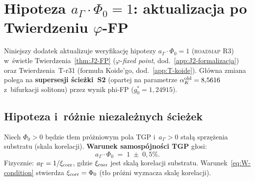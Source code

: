 \section{Hipoteza $a_\Gamma \cdot \Phi_0 = 1$: aktualizacja po
  Twierdzeniu $\varphi$-FP}%
\label{app:W-agamma}

Niniejszy dodatek aktualizuje weryfikacj\k{e} hipotezy
$a_\Gamma \cdot \Phi_0 = 1$ (\textsc{roadmap} R3) w~\'{s}wietle
Twierdzenia~\ref{thm:J2-FP} ($\varphi$-\emph{fixed point},
dod.~\ref{app:J2-formalizacja}) oraz Twierdzenia~T-r31 (formu\l{}a Koide'go,
dod.~\ref{app:T-koide}).
G\l{}\'owna zmiana polega na \textbf{supersesji \'{s}cie\.zki~S2}
(opartej na parametrze $\alpha_K^{\rm old} = 8{,}5616$
z~bifurkacji solitonu) przez wynik phi-FP
($g_0^* = 1{,}24915$).

\medskip
\noindent{}
\medskip

\subsection{Hipoteza i~ró\.znie niezale\.znych \'{s}cie\.zek}%
\label{app:W-hypothesis}

\begin{definition}%
\label{def:W-self-consistency}
Niech $\Phi_0 > 0$ b\k{e}dzie t\l{}em pr\'o\.zniowym pola TGP
i~$a_\Gamma > 0$ sta\l{}\k{a} sprz\k{e}\.zenia substratu (skala korelacji).
\textbf{Warunek samospójno\'{s}ci TGP} g\l{}osi:
\begin{equation}\label{eq:W-condition}
  a_\Gamma \cdot \Phi_0 \;=\; 1 \;\pm\; 0{,}5\%.
\end{equation}
Fizycznie: $a_\Gamma = 1/\xi_{\rm corr}$, gdzie $\xi_{\rm corr}$
jest skal\k{a} korelacji substratu.
Warunek~\eqref{eq:W-condition} stwierdza $\xi_{\rm corr} = \Phi_0$
(t\l{}o pr\'o\.zni wyznacza skal\k{e} korelacji).
\end{definition}

